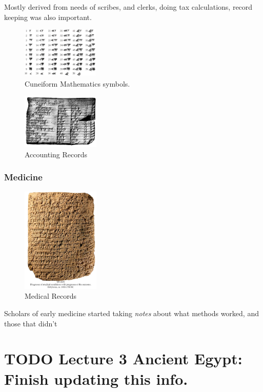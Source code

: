\documentclass[11pt]{article}
\begin{document}
Mostly derived from needs of scribes, and clerks, doing tax calculations, record keeping was also important.

\begin{figure}[htb]
\centering
\includegraphics[width=10em]{./img/CuneMath.png}
\caption{Cuneiform Mathematics symbols.}
\end{figure}

\begin{figure}[htb]
\centering
\includegraphics[width=10em]{./img/acctRecs.png}
\caption{Accounting Records}
\end{figure}

\subsubsection{Medicine}
\label{sec-3.8.6}

\begin{figure}[htb]
\centering
\includegraphics[width=10em]{./img/MedRecs.png}
\caption{Medical Records}
\end{figure}

Scholars of early medicine started taking \emph{notes} about what methods worked, and those that didn't


\section{\textbf{TODO} Lecture 3 Ancient Egypt: Finish updating this info.}
\label{sec-4}
\end{document}
